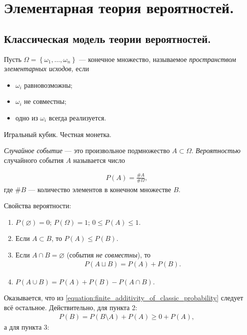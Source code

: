 
\section{Элементарная теория вероятностей.}
\subsection{Классическая модель теории вероятностей.}

\begin{df*}
 Пусть $\Omega = \left\{ \omega_1, \ldots, \omega_n \right\}$ --- конечное множество, называемое \textit{пространством элементарных исходов,} если
 \begin{itemize}
  \item $\omega_i$ равновозможны;
  \item $\omega_i$ не совместны;
  \item одно из $\omega_i$ всегда реализуется.
 \end{itemize}
\end{df*}
\begin{exmpl*}
 Игральный кубик. Честная монетка.
\end{exmpl*}

\begin{df}
 \textit{Случайное событие}  --- это произвольное подмножество $A \subset \Omega$. \textit{Вероятностью} случайного события $A$ называется число

 \begin{align*}
  P(A) = \frac{\# A}{\# \Omega}
 ,\end{align*} где $\# B$ --- количество элементов в конечном множестве $B$.
\end{df}

\begin{prop*}
 Свойства вероятности:
 \begin{enumerate}
  \item $P(\varnothing) = 0$; $P(\Omega) = 1$; $0 \leqslant P(A) \leqslant 1$.
  \item Если $A \subset B$, то $P(A) \leqslant P(B)$.
  \item Если $A \cap B = \varnothing$ (события \textit{не совместны}), то
   \begin{align}
    \label{equation:finite_additivity_of_classic_probability}
    P(A \sqcup B) = P(A) + P(B)
   .\end{align} 
  \item $P(A \cup B) = P(A) + P(B) - P(A \cap B)$.
 \end{enumerate}
\end{prop*}
Оказывается, что из \eqref{equation:finite_additivity_of_classic_probability} следует всё остальное. Действительно, для пункта 2:
\begin{align*}
 P(B) = P(B \setminus A) + P(A) \geqslant 0 + P(A),
\end{align*}  а для пункта 3:

